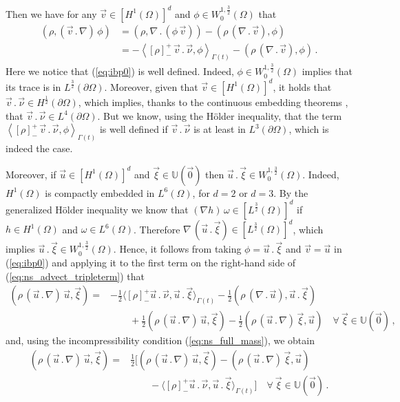 \documentclass[a4paper,12pt,onecolumn]{article}
\newcommand{\uspace}[1]{\mathbb{U}(\vec{#1})}
\begin{document}
Then we have for any $\vec v \in [H^1(\Omega)]^d$ and
$\phi\in W_0^{1,\frac{3}{2}}(\Omega)$ that
\begin{align}\label{eq:ibp0}
( \rho,(\vec v \,.\,\nabla)\,\phi) & = (\rho, \nabla\,.\,(\phi\,\vec v))
- (\rho\,(\nabla\,.\,\vec v), \phi) \nonumber \\ & =
- \left\langle [\rho]_-^+\,\vec v\,.\,\vec \nu,
  \phi \right\rangle_{\Gamma(t)}
- (\rho\,(\nabla\,.\,\vec v), \phi)\,.
\end{align}
Here we notice that (\ref{eq:ibp0}) is well defined. Indeed, $\phi\in
W_0^{1,\frac{3}{2}}(\Omega)$ implies that its trace is in
$L^{\frac{3}{2}}(\partial\Omega)$. Moreover, given that
$\vec v \in [H^1(\Omega)]^d$, it holds that $\vec v\,.\,\vec\nu \in
H^{\frac{1}{2}}(\partial\Omega)$, which implies, thanks to the continuous
embedding theorems \cite[Theorem~6.5 and 6.7]{DINEZZA2012}, that $\vec
v\,.\,\vec\nu \in L^4(\partial\Omega)$. But we know, using the
H\"{o}lder inequality, that the term $\left\langle [\rho]_-^+\,\vec v\,.\,
\vec \nu, \phi \right\rangle_{\Gamma(t)}$ is well defined if
$\vec v\,.\,\vec\nu$ is at least in $L^3(\partial\Omega)$, which is indeed the
case.

Moreover, if $\vec u\in [H^1(\Omega)]^d$ and $\vec \xi \in \uspace{0}$ then
$\vec u\,.\,\vec\xi \in W_0^{1,\frac{3}{2}}(\Omega)$. Indeed, $H^1(\Omega)$ is
compactly embedded in $L^6(\Omega)$, for $d=2$ or $d=3$. By the
generalized H\"{o}lder inequality we know that $(\nabla h)\,\omega\in
[L^{\frac{3}{2}}(\Omega)]^d$ if $h\in H^1(\Omega)$ and $\omega\in L^6(\Omega)$.
Therefore $\nabla\,(\vec u\,.\,\vec \xi)\in [L^{\frac{3}{2}}(\Omega)]^d$,
which implies
$\vec u\,.\,\vec \xi \in W_0^{1,\frac{3}{2}}(\Omega)$. Hence, it follows from
taking $\phi = \vec u\,.\,\vec\xi$ and $\vec v = \vec u$ in (\ref{eq:ibp0}) and
applying it to the first term on the right-hand side of
(\ref{eq:ns_advect_tripleterm}) that
\begin{align}\label{eq:fulladvect}
( \rho\,(\vec u \,.\,\nabla)\,\vec u, \vec \xi) = &
-\tfrac{1}{2}\langle [\rho]_-^+\vec u\,.\,\vec \nu, \vec u\,.\,\vec \xi
\rangle_{\Gamma(t)}
-\tfrac{1}{2}(\rho\,(\nabla\,.\,\vec u ),\vec u\,.\,\vec\xi) \nonumber \\
& \qquad +\tfrac{1}{2}(\rho\,(\vec u\,.\,\nabla)\,\vec u, \vec \xi)
-\tfrac{1}{2}(\rho\,(\vec u\,.\,\nabla)\,\vec \xi,\vec u)
\quad \forall\ \vec \xi \in \uspace 0\,,
\end{align}
and, using the incompressibility condition (\ref{eq:ns_full_mass}), we obtain
\begin{align}\label{eq:advect}
( \rho\,(\vec u \,.\,\nabla)\,\vec u, \vec \xi)
= & \tfrac{1}{2} [ (\rho\,(\vec u\,.\,\nabla)\,\vec u, \vec \xi) -
(\rho\,(\vec u\,.\,\nabla)\,\vec \xi,\vec u) \nonumber \\
& \qquad -\langle [\rho]_-^+\vec u\,.\,\vec \nu, \vec u\,.\,\vec \xi
\rangle_{\Gamma(t)}] \quad \forall\ \vec \xi \in \uspace 0\,.
\end{align}
\end{document}
